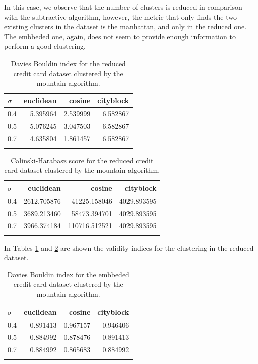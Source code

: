 In this case, we observe that the number of clusters is reduced in comparison with the subtractive algorithm, however, the metric that only finds the two existing clusters in the dataset is the manhattan, and only in the reduced one. The embbeded one, again, does not seem to provide enough information to perform a good clustering.

\begin{table}[ht!]
    \centering
    \begin{tabular}{lrrr}
        \toprule
        $\sigma$ &  euclidean &    cosine &  cityblock \\
        \midrule
        0.4 &   5.395964 &  2.539999 &   6.582867 \\
        0.5 &   5.076245 &  3.047503 &   6.582867 \\
        0.7 &   4.635804 &  1.861457 &   6.582867 \\
        \bottomrule \\
        \end{tabular}
    \caption{Davies Bouldin index for the reduced credit card dataset clustered by the mountain algorithm.}
    \label{tab:c2_db_m}
\end{table}

\begin{table}[ht!]
    \centering
    \begin{tabular}{lrrr}
    \toprule
    $\sigma$ &    euclidean &         cosine &    cityblock \\
    \midrule
    0.4 &  2612.705876 &   41225.158046 &  4029.893595 \\
    0.5 &  3689.213460 &   58473.394701 &  4029.893595 \\
    0.7 &  3966.374184 &  110716.512521 &  4029.893595 \\
    \bottomrule \\
    \end{tabular}
    \caption{Calinski-Harabasz score for the reduced credit card dataset clustered by the mountain algorithm.}
    \label{tab:c2_ch_m}
    \end{table}
    
    In Tables \ref{tab:c2_db_m} and \ref{tab:c2_ch_m} are shown the validity indices for the clustering in the reduced dataset.
    
\begin{table}[ht!]
    \centering
    \begin{tabular}{lrrr}
        \toprule
        $\sigma$ &  euclidean &    cosine &  cityblock \\
        \midrule
        0.4 &   0.891413 &  0.967157 &   0.946406 \\
        0.5 &   0.884992 &  0.878476 &   0.891413 \\
        0.7 &   0.884992 &  0.865683 &   0.884992 \\
        \bottomrule \\
        \end{tabular}
    \caption{Davies Bouldin index for the embbeded credit card dataset clustered by the mountain algorithm.}
    \label{tab:ce_db_m}
\end{table}


